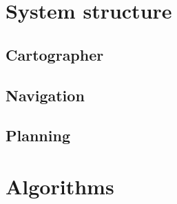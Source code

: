 
\section{System structure}
\label{sec:system}

\subsection{Cartographer}
\label{sec:cart}

\subsection{Navigation}
\label{sec:nav}

\subsection{Planning}
\label{sec:plan}


\section{Algorithms}
\label{sec:algo}
